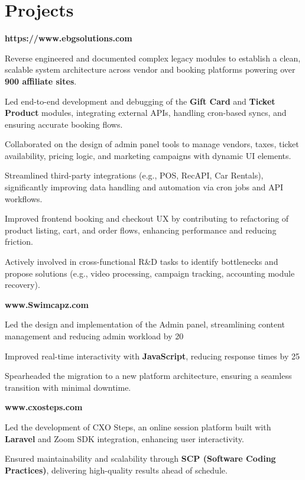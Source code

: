 \documentclass[letterpaper,10pt]{article}
\newcommand{\heading}[2]{
  \hspace{10pt}#1\hfill#2\\
}
\newcommand{\headingBf}[2]{
  \heading{\textbf{#1}}{\textbf{#2}}
}
\newenvironment{resume_list}{
  \vspace{-7pt}
  \begin{itemize}[itemsep=-2px, parsep=1pt, leftmargin=30pt]
}{
  \end{itemize}
}
\begin{document}
\section{Projects}

\headingBf{https://www.ebgsolutions.com}{}
\begin{resume_list}
    \item Reverse engineered and documented complex legacy modules to establish a clean, scalable system architecture across vendor and booking platforms powering over \textbf{900 affiliate sites}.
    \item Led end-to-end development and debugging of the \textbf{Gift Card } and \textbf{Ticket Product} modules, integrating external APIs, handling cron-based syncs, and ensuring accurate booking flows.
    \item Collaborated on the design of admin panel tools to manage vendors, taxes, ticket availability, pricing logic, and marketing campaigns with dynamic UI elements.
    \item Streamlined third-party integrations (e.g., POS, RecAPI, Car Rentals), significantly improving data handling and automation via cron jobs and API workflows.
    \item Improved frontend booking and checkout UX by contributing to refactoring of product listing, cart, and order flows, enhancing performance and reducing friction.
    \item Actively involved in cross-functional R\&D tasks to identify bottlenecks and propose solutions (e.g., video processing, campaign tracking, accounting module recovery).
\end{resume_list}



\headingBf{www.Swimcapz.com}{}
\begin{resume_list}
    \item Led the design and implementation of the Admin panel, streamlining content management and reducing admin workload by 20%
    \item Improved real-time interactivity with \textbf{JavaScript}, reducing response times by 25%
    \item Spearheaded the migration to a new platform architecture, ensuring a seamless transition with minimal downtime.
\end{resume_list}

\headingBf{www.cxosteps.com}{}
\begin{resume_list}
    \item Led the development of CXO Steps, an online session platform built with \textbf{Laravel} and Zoom SDK integration, enhancing user interactivity.
    \item Ensured maintainability and scalability through \textbf{SCP (Software Coding Practices)}, delivering high-quality results ahead of schedule.
\end{resume_list}
\end{document}
